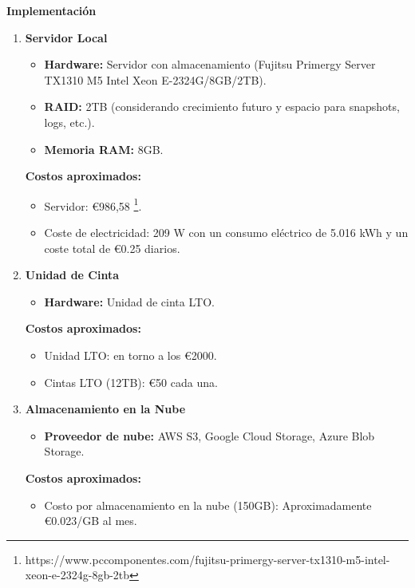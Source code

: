 \textbf{Implementación}
\begin{enumerate}
    \item \textbf{Servidor Local}
    \begin{itemize}
        \item \textbf{Hardware:} Servidor con almacenamiento (Fujitsu Primergy Server TX1310 M5 Intel Xeon E-2324G/8GB/2TB).
        \item \textbf{RAID:} 2TB (considerando crecimiento futuro y espacio para snapshots, logs, etc.).
        \item \textbf{Memoria RAM:} 8GB.
    \end{itemize}
    \textbf{Costos aproximados:}
    \begin{itemize}
        \item Servidor: €986,58 \footnote{https://www.pccomponentes.com/fujitsu-primergy-server-tx1310-m5-intel-xeon-e-2324g-8gb-2tb}.
        \item Coste de electricidad: 209 W con un consumo eléctrico de 5.016 kWh y un coste total de €0.25 diarios.
    \end{itemize}

    \item \textbf{Unidad de Cinta}
    \begin{itemize}
        \item \textbf{Hardware:} Unidad de cinta LTO.
    \end{itemize}
    \textbf{Costos aproximados:}
    \begin{itemize}
        \item Unidad LTO: en torno a los €2000.
        \item Cintas LTO (12TB): €50 cada una.
    \end{itemize}

    \item \textbf{Almacenamiento en la Nube}
    \begin{itemize}
        \item \textbf{Proveedor de nube:} AWS S3, Google Cloud Storage, Azure Blob Storage.
    \end{itemize}
    \textbf{Costos aproximados:}
    \begin{itemize}
        \item Costo por almacenamiento en la nube (150GB): Aproximadamente €0.023/GB al mes.
    \end{itemize}
\end{enumerate}

